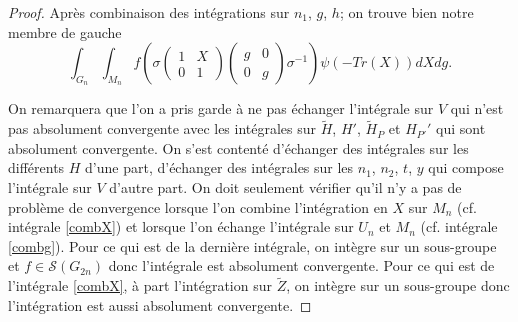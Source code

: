 \documentclass{amsart}
\begin{document}
\begin{proof}
Après combinaison des intégrations sur $n_1$, $g$, $h$; on trouve bien notre membre de gauche
\begin{equation}
\int_{G_n} \int_{M_n}  f\left(\sigma \begin{pmatrix}
1 & X \\
0 & 1
\end{pmatrix} \begin{pmatrix}
g & 0 \\
0 & g
\end{pmatrix} \sigma^{-1} \right) \psi(-Tr(X))  dX dg.
\end{equation}

On remarquera que l'on a pris garde à ne pas échanger l'intégrale sur $V$ qui n'est pas absolument convergente avec les intégrales sur $\tilde{H}$, $H'$, $\tilde{H}_P$ et $H_{P'}'$ qui sont absolument convergente. On s'est contenté d'échanger des intégrales sur les différents $H$ d'une part, d'échanger des intégrales sur les $n_1$, $n_2$, $t$, $y$ qui compose l'intégrale sur $V$ d'autre part. On doit seulement vérifier qu'il n'y a pas de problème de convergence lorsque l'on combine l'intégration en $X$ sur $M_n$ (cf. intégrale \ref{combX}) et lorsque l'on échange l'intégrale sur $U_n$ et $M_n$ (cf. intégrale \ref{combg}). Pour ce qui est de la dernière intégrale, on intègre sur un sous-groupe et $f \in \mathcal{S}(G_{2n})$ donc l'intégrale est absolument convergente. Pour ce qui est de l'intégrale \ref{combX}, à part l'intégration sur $\tilde{Z}$, on intègre sur un sous-groupe donc l'intégration est aussi absolument convergente.


\end{proof}
\end{document}
